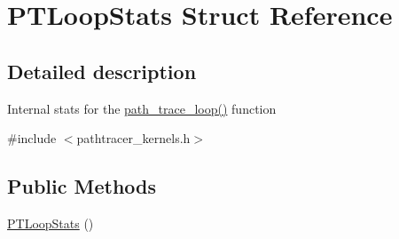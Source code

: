 \hypertarget{struct_p_t_loop_stats}{}\section{P\+T\+Loop\+Stats Struct Reference}
\label{struct_p_t_loop_stats}


\subsection{Detailed description}
Internal stats for the \hyperlink{group___p_t_lib_gadbd6e824e2ecdd07fae235bddebcd1d8}{path\+\_\+trace\+\_\+loop()} function 

{\ttfamily \#include $<$pathtracer\+\_\+kernels.\+h$>$}

\subsection*{Public Methods}
\begin{DoxyCompactItemize}
\item 
\hyperlink{struct_p_t_loop_stats_a5b8c04577ddcc4d68863d5dc35bffa47}{P\+T\+Loop\+Stats} ()
\end{DoxyCompactItemize}
